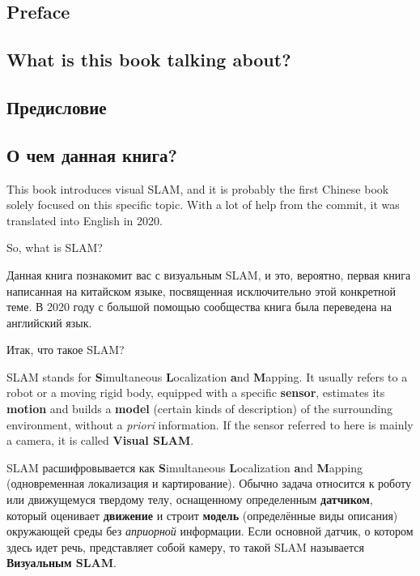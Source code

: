 \begin{English}
    \chapter*{Preface}
    \section*{What is this book talking about?}
\end{English}

\begin{Russian}
    \chapter*{Предисловие}
    \section*{О чем данная книга?}
\end{Russian}
\label{cpt:1}

\begin{English}
    This book introduces visual SLAM, and it is probably the first Chinese book solely focused on this specific topic. With a lot of help from the commit, it was translated into English in 2020.

    So, what is SLAM?
\end{English}

\begin{Russian}
    Данная книга познакомит вас с визуальным SLAM, и это, вероятно, первая книга написанная на китайском языке, посвященная исключительно этой конкретной теме. В 2020 году с большой помощью сообщества книга была переведена на английский язык.
    
    Итак, что такое SLAM?     
\end{Russian}

\begin{English}
    SLAM stands for \textbf{S}imultaneous \textbf{L}ocalization \textbf{a}nd \textbf{M}apping. It usually refers to a robot or a moving rigid body, equipped with a specific \textbf{sensor}, estimates its \textbf{motion} and builds a \textbf{model} (certain kinds of description) of the surrounding environment, without a \textit{priori} information\cite{Davison2007}. If the sensor referred to here is mainly a camera, it is called \textbf{Visual SLAM}.
\end{English}

\begin{Russian}
    SLAM расшифровывается как \textbf{S}imultaneous \textbf{L}ocalization \textbf{a}nd \textbf{M}apping (одновременная локализация и картирование). Обычно задача относится к роботу или движущемуся твердому телу, оснащенному определенным \textbf{датчиком}, который оценивает \textbf{движение} и строит \textbf{модель} (определённые виды описания) окружающей среды без \textit{априорной} информации\cite{Davison2007}. Если основной датчик, о котором здесь идет речь, представляет собой камеру, то такой SLAM называется \textbf{Визуальным SLAM}. 
\end{Russian}

